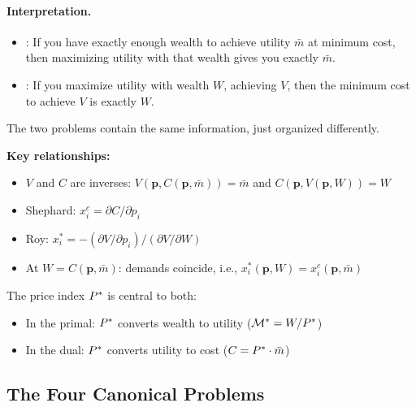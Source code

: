 \paragraph{Interpretation.}
\begin{itemize}[leftmargin=2em]
\item {}: If you have exactly enough wealth to achieve utility $\bar{m}$ at minimum cost, then maximizing utility with that wealth gives you exactly $\bar{m}$.
\item {}: If you maximize utility with wealth $W$, achieving $V$, then the minimum cost to achieve $V$ is exactly $W$.
\end{itemize}

The two problems contain the same information, just organized differently.

\begin{calloutimportant}
\textbf{Key relationships:}
\begin{itemize}[leftmargin=2em, nosep]
\item $V$ and $C$ are inverses: $V(\mathbf{p}, C(\mathbf{p}, \bar{m})) = \bar{m}$ and $C(\mathbf{p}, V(\mathbf{p}, W)) = W$
\item Shephard: $x_i^c = \partial C / \partial p_i$
\item Roy: $x_i^* = -(\partial V / \partial p_i) / (\partial V / \partial W)$
\item At $W = C(\mathbf{p}, \bar{m})$: demands coincide, i.e., $x_i^*(\mathbf{p}, W) = x_i^c(\mathbf{p}, \bar{m})$
\end{itemize}

\medskip
The price index $P^{*}$ is central to both:
\begin{itemize}[leftmargin=2em, nosep]
\item In the primal: $P^{*}$ converts wealth to utility ($\mathcal{M}^* = W/P^{*}$)
\item In the dual: $P^{*}$ converts utility to cost ($C = P^{*} \cdot \bar{m}$)
\end{itemize}
\end{calloutimportant}

\subsection{The Four Canonical Problems}
\label{subsec:four-problems}

